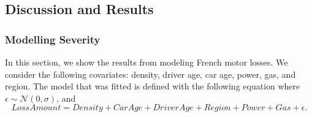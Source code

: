 \documentclass[11pt,letterpaper]{article}
\numberwithin{equation}{section}
\numberwithin{equation}{section}
\numberwithin{equation}{section}
\begin{document}
\subsection{Discussion and Results}
\subsubsection{Modelling Severity}
In this section, we show the results from modeling French motor losses. We consider the following covariates: density, driver age, car age, power, gas,  and region. %
The model that was fitted is defined with the following equation where $\epsilon \sim \mathcal{N}(0,\sigma)$, and
\begin{equation}
Loss Amount =  Density + Car Age + Driver Age + Region + Power + Gas + \epsilon. \label{regressionModel}
\end{equation}
\end{document}
